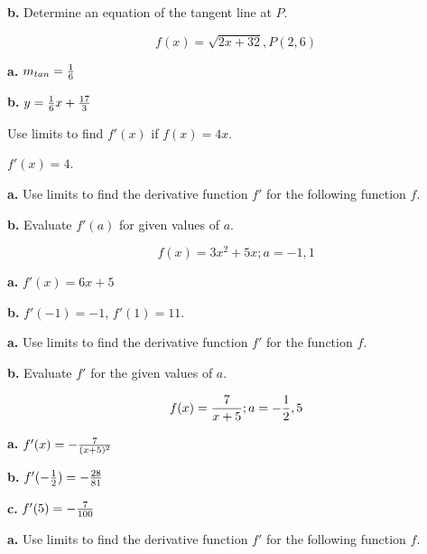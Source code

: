 \par {\bf b.} Determine an equation of the tangent line at $P$.

$$\
f(x) = \sqrt{2x + 32}, P(2, 6)
$$

\par {\bf a.} $m_{tan} = {1 \over 6}$

\par {\bf b.} $y = {1 \over 6}x + {17 \over 3}$

\bigskip

Use limits to find $f'(x)$ if $f(x) = 4x$.

$f'(x) = 4$.

\bigskip
{}
\bigskip
{}
\bigskip

\par {\bf a.} Use limits to find the derivative function $f'$ for
the following function $f$.

\par {\bf b.} Evaluate $f'(a)$ for given values of $a$.

$$\
f(x) = 3x^2 + 5x; a=-1, 1
$$

\par {\bf a.} $f'(x) = 6x + 5$

\par {\bf b.} $f'(-1) = -1$, $f'(1) = 11$.

\bigskip

\par {\bf a.} Use limits to find the derivative function $f'$
for the function $f$.

\par {\bf b.} Evaluate $f'$ for the given values of $a$.

$$\
f(x) = {7 \over x + 5}; a = -{1 \over 2}, 5
$$


\par {\bf a.} $f'(x) = - {7 \over (x + 5)^2}$

\par {\bf b.} $f'(-{1 \over 2}) = - {28 \over 81}$

\par {\bf c.} $f'(5) = - {7 \over 100}$

\bigskip

\par {\bf a.} Use limits to find the derivative function $f'$ for
the following function $f$.

